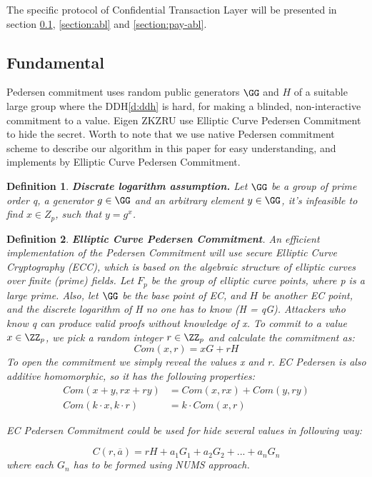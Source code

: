 \documentclass{article}
\newtheorem{myDef}{Definition}
\begin{document}
The specific protocol of Confidential Transaction Layer will be presented in section \ref{section:fundanmental}, \ref{section:abl} and \ref{section:pay-abl}.

\subsection{Fundamental} \label{section:fundanmental}

Pedersen commitment \cite{pedersen1991non} uses random public generators $\GG$ and $H$ of a suitable large group where the DDH\ref{d:ddh} is hard, for making a blinded, non-interactive commitment to a value. Eigen ZKZRU use Elliptic Curve Pedersen Commitment to hide the secret. Worth to note that we use native Pedersen commitment scheme to describe our algorithm in this paper for easy understanding, and implements by Elliptic Curve Pedersen Commitment.

\begin{myDef}
\label{d:dla}
\textbf{Discrate logarithm assumption.} Let $\GG$ be a group of prime order q, a generator $g \in \GG$ and an arbitrary element $y \in \GG$, it's infeasible to find $x \in Z_p$, such that $y = g^x$.
\end{myDef}

\begin{myDef}
\label{d:ecpc}
\textbf{Elliptic Curve Pedersen Commitment\cite{francca2015homomorphic}}. An efficient implementation of the Pedersen Commitment will use secure Elliptic Curve Cryptography (ECC), which is based on the algebraic structure of elliptic curves over finite (prime) fields. Let $F_p$ be the
group of elliptic curve points, where p is a large prime. Also, let $\GG$ be the base point of EC, and ${H}$ be another EC point, and the discrete logarithm of H no one has to know (H = qG). Attackers who know q can produce valid proofs without knowledge of x. To commit to a value $x \in \ZZ_p$, we pick a random integer $r \in \ZZ_p$ and calculate the commitment as:
$$
Com(x, r) = xG + rH
$$
To open the commitment we simply reveal the values x and r. EC Pedersen is also additive homomorphic, so it has the following properties:
\begin{equation}
\begin{split}
Com(x + y, rx + ry) &= Com(x, rx) + Com(y, ry) \\
Com(k \cdot x, k \cdot r) &= k \cdot Com(x, r)
\end{split}
\end{equation}

EC Pedersen Commitment could be used for hide several values in following way:

\begin{equation}
    C(r, \overline{a}) = rH + a_1G_1 + a_2G_2 + ... + a_nG_n
\end{equation}
where each $G_n$ has to be formed using NUMS\cite{black2014elliptic} approach. 

\end{myDef}
\end{document}
